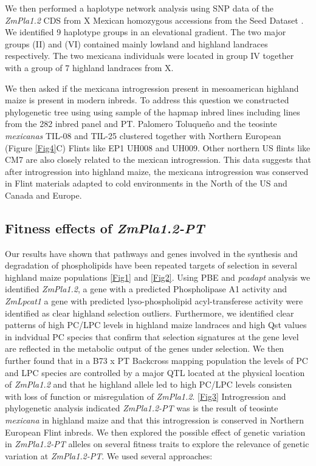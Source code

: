 \documentclass[9pt,twocolumn,twoside,lineno]{gsajnl}
\begin{document}
We then performed a haplotype network analysis using SNP data of the \textit{ZmPla1.2} CDS from X Mexican homozygous accessions from the Seed Dataset \cite{Romero_Navarro2017-cn}. We identified 9 haplotype groups in an elevational gradient. The two major groups (II) and (VI) contained mainly lowland and highland landraces respectively. The two mexicana individuals were located in group IV together with a group of 7 highland landraces from X. 

We then asked if the mexicana introgression present in mesoamerican highland maize is present in modern inbreds. To address this question we constructed phylogenetic tree using using sample of the hapmap inbred lines including lines from the 282 inbred panel and PT. Palomero Toluqueño and the teosinte \textit{mexicanas} TIL-08 and TIL-25 clustered together with Northern European (Figure \ref{Fig4}C) Flints like EP1 UH008 and UH009. Other northern US flints like CM7 are also closely related to the mexican introgression. This data suggests that after introgression into highland maize, the mexicana introgression was conserved in Flint materials adapted to cold environments in the North of the US and Canada and Europe. 

\subsection{Fitness effects of \textit{ZmPla1.2-PT}}

Our results have shown that pathways and genes involved in the synthesis and degradation of phospholipids have been repeated targets of selection in several highland maize populations \ref{Fig1} and \ref{Fig2}. 
Using PBE and \textit{pcadapt} analysis we identified \textit{ZmPla1.2}, a gene with a predicted Phospholipase A1 activity and \textit{ZmLpcat1} a gene with predicted lyso-phospholipid acyl-transferese activity were identified as clear highland selection outliers. 
Furthermore, we identified clear patterns of high PC/LPC levels in highland maize landraces and high Qst values in indvidual PC species that confirm that selection signatures at the gene level are reflected in the metabolic output of the genes under selection. 
We then further found that in a B73 x PT Backcross mapping population the levels of PC and LPC species are controlled by a major QTL located at the physical location of \textit{ZmPla1.2} and that he highland allele led to high PC/LPC levels consisten with loss of function or misregulation of \textit{ZmPla1.2}. \ref{Fig3}  Introgression and phylogenetic analysis indicated \textit{ZmPla1.2-PT} was is the result of teosinte \textit{mexicana} in highland maize and that this introgression is conserved in Northern European Flint inbreds.
We then explored the possible effect of genetic variation in \textit{ZmPla1.2-PT} alleles on several fitness traits to explore the relevance of genetic variation at \textit{ZmPla1.2-PT}. We used several approaches:
\end{document}
